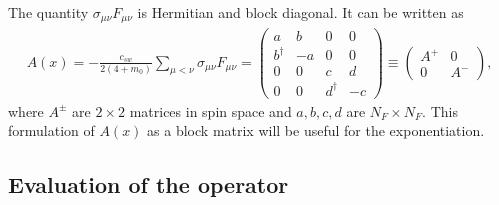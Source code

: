 \documentclass[12pt]{article}
\begin{document}
The quantity $\sigma_{\mu\nu}F_{\mu\nu}$ is Hermitian and block diagonal. It can be written as
\begin{align}
A(x)=-\frac{c_{sw}}{2(4+m_0)} \sum_{\mu<\nu}\sigma_{\mu\nu}F_{\mu\nu} = 
 \begin{pmatrix}
 a & b & 0 & 0 \\
 b^\dagger & -a & 0 & 0 \\
 0  & 0 & c & d \\
 0 & 0 & d^\dagger & -c
 \end{pmatrix} \equiv \begin{pmatrix}
 A^+ & 0 \\ 
 0 & A^- 
 \end{pmatrix}, \label{eq:blocks}
\end{align}
where $A^\pm$ are $2 \times 2$ matrices in spin space and $a,b,c,d$ are $N_F \times N_F$. This formulation of $A(x)$ as a block matrix will be useful for the exponentiation.

\subsection*{Evaluation of the operator}
\end{document}
